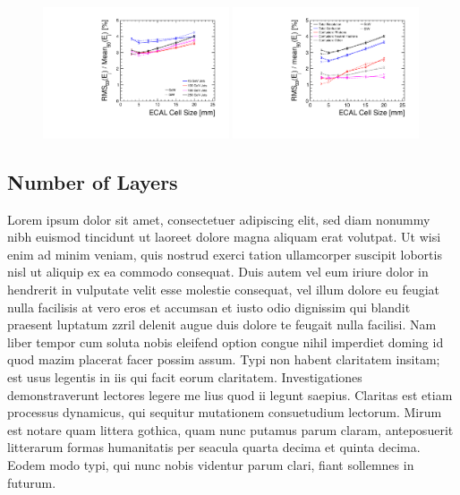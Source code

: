 \documentclass[final,3p,times,twocolumn]{elsarticle}
\begin{document}
\begin{figure}[!h]
  \begin{center}
     \includegraphics[width=0.49\textwidth]{Res_vs_C_diffE_Photon.pdf}
     \includegraphics[width=0.49\textwidth]{Confusion_vs_C_250.pdf}
     \caption{\label{}}
  \end{center}
\end{figure}


\subsection{Number of Layers}
Lorem ipsum dolor sit amet, consectetuer adipiscing elit, sed diam nonummy nibh euismod tincidunt ut laoreet dolore magna aliquam erat volutpat. Ut wisi enim ad minim veniam, quis
nostrud exerci tation ullamcorper suscipit lobortis nisl ut aliquip ex ea commodo consequat. Duis autem vel eum iriure dolor in hendrerit in vulputate velit esse molestie consequat,
vel illum dolore eu feugiat nulla facilisis at vero eros et accumsan et iusto odio dignissim qui blandit praesent luptatum zzril delenit augue duis dolore te feugait nulla facilisi.
Nam liber tempor cum soluta nobis eleifend option congue nihil imperdiet doming id quod mazim placerat facer possim assum. Typi non habent claritatem insitam; est usus legentis in
iis qui facit eorum claritatem. Investigationes demonstraverunt lectores legere me lius quod ii legunt saepius. Claritas est etiam processus dynamicus, qui sequitur mutationem
consuetudium lectorum. Mirum est notare quam littera gothica, quam nunc putamus parum claram, anteposuerit litterarum formas humanitatis per seacula quarta decima et quinta
decima. Eodem modo typi, qui nunc nobis videntur parum clari, fiant sollemnes in futurum.
\end{document}
